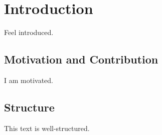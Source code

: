 \chapter{Introduction}

	Feel introduced.
	
	\section{Motivation and Contribution}
	
		I am motivated.
	
	\section{Structure}
	
		This text is well-structured.
